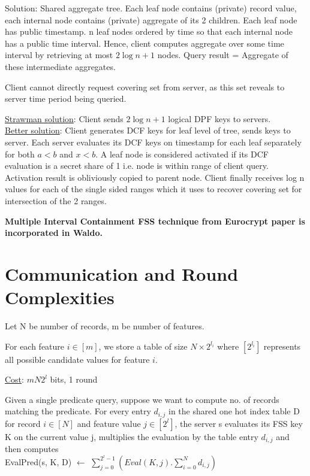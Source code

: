 Solution: Shared aggregate tree. Each leaf node contains (private) record value, each internal node contains (private) aggregate of its 2 children. Each leaf node has public timestamp. n leaf nodes ordered by time so that each internal node has a public time interval. Hence, client computes aggregate over some time interval by retrieving at most $2\log n + 1$ nodes. Query result = Aggregate of these intermediate aggregates.

Client cannot directly request covering set from server, as this set reveals to server time period being queried.

\underline{Strawman solution}: Client sends $2\log n + 1$ logical DPF keys to servers. \\
\underline{Better solution}: Client generates DCF keys for leaf level of tree, sends keys to server. Each server evaluates its DCF keys on timestamp for each leaf separately for both $a < b$ and $x < b$. A leaf node is considered activated if its DCF evaluation is a secret share of 1 i.e. node is within range of client query. Activation result is obliviously copied to parent node. Client finally receives log n values for each of the single sided ranges which it uses to recover covering set for intersection of the 2 ranges.

\textbf{Multiple Interval Containment FSS technique from Eurocrypt paper is incorporated in Waldo.}

\section{Communication and Round Complexities}
Let N be number of records, m be number of features.

For each feature $i \in [m]$, we store a table of size $N \times 2^{l_i}$ where $[2^{l_i}]$ represents all possible candidate values for feature $i$. 

\underline{Cost}: $mN2^l$ bits, 1 round

Given a single predicate query, suppose we want to compute no. of records matching the predicate. For every entry $d_{i, j}$ in the shared one hot index table D for record $i \in [N]$ and feature value $j \in [2^l]$, the server s evaluates its FSS key K on the current value j, multiplies the evaluation by the table entry $d_{i, j}$ and then computes \\

EvalPred(s, K, D) $\leftarrow$ $\sum_{j=0}^{2^l-1}(Eval(K, j).\sum_{i=0}^N d_{i, j})$ \\

